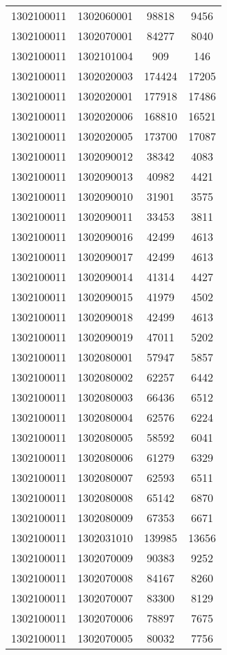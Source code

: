 \begin{longtable}[h]{llcc}
		1302100011 & 1302060001 & 98818 & 9456\\
		1302100011 & 1302070001 & 84277 & 8040\\
		1302100011 & 1302101004 & 909 & 146\\
		1302100011 & 1302020003 & 174424 & 17205\\
		1302100011 & 1302020001 & 177918 & 17486\\
		1302100011 & 1302020006 & 168810 & 16521\\
		1302100011 & 1302020005 & 173700 & 17087\\
		1302100011 & 1302090012 & 38342 & 4083\\
		1302100011 & 1302090013 & 40982 & 4421\\
		1302100011 & 1302090010 & 31901 & 3575\\
		1302100011 & 1302090011 & 33453 & 3811\\
		1302100011 & 1302090016 & 42499 & 4613\\
		1302100011 & 1302090017 & 42499 & 4613\\
		1302100011 & 1302090014 & 41314 & 4427\\
		1302100011 & 1302090015 & 41979 & 4502\\
		1302100011 & 1302090018 & 42499 & 4613\\
		1302100011 & 1302090019 & 47011 & 5202\\
		1302100011 & 1302080001 & 57947 & 5857\\
		1302100011 & 1302080002 & 62257 & 6442\\
		1302100011 & 1302080003 & 66436 & 6512\\
		1302100011 & 1302080004 & 62576 & 6224\\
		1302100011 & 1302080005 & 58592 & 6041\\
		1302100011 & 1302080006 & 61279 & 6329\\
		1302100011 & 1302080007 & 62593 & 6511\\
		1302100011 & 1302080008 & 65142 & 6870\\
		1302100011 & 1302080009 & 67353 & 6671\\
		1302100011 & 1302031010 & 139985 & 13656\\
		1302100011 & 1302070009 & 90383 & 9252\\
		1302100011 & 1302070008 & 84167 & 8260\\
		1302100011 & 1302070007 & 83300 & 8129\\
		1302100011 & 1302070006 & 78897 & 7675\\
		1302100011 & 1302070005 & 80032 & 7756\\

\end{longtable}

